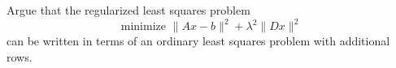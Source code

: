 \documentclass[12pt, leqno]{article}
\begin{document}

Argue that the regularized least squares problem
\[
  \mbox{minimize } \|Ax-b\|^2 + \lambda^2 \|Dx\|^2
\]
can be written in terms of an ordinary least squares problem with additional rows.
\end{document}
